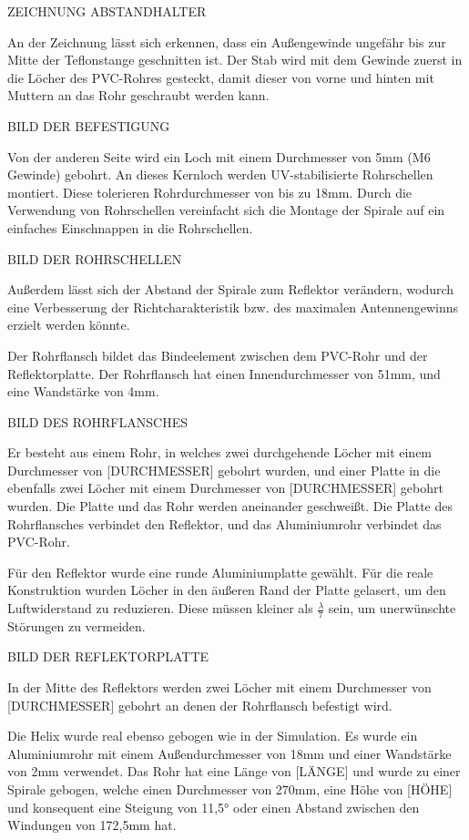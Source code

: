 ZEICHNUNG ABSTANDHALTER

An der Zeichnung lässt sich erkennen, dass ein Außengewinde ungefähr bis zur Mitte der Teflonstange geschnitten ist. Der Stab wird mit dem Gewinde zuerst in die Löcher des PVC-Rohres gesteckt, damit dieser von vorne und hinten mit Muttern an das Rohr geschraubt werden kann.

BILD DER BEFESTIGUNG

Von der anderen Seite wird ein Loch mit einem Durchmesser von 5mm (M6 Gewinde) gebohrt. An dieses Kernloch werden UV-stabilisierte Rohrschellen montiert. Diese tolerieren Rohrdurchmesser von bis zu 18mm. Durch die Verwendung von Rohrschellen vereinfacht sich die Montage der Spirale auf ein einfaches Einschnappen in die Rohrschellen.

BILD DER ROHRSCHELLEN

Außerdem lässt sich der Abstand der Spirale zum Reflektor verändern, wodurch eine Verbesserung der Richtcharakteristik bzw. des maximalen Antennengewinns erzielt werden könnte.

Der Rohrflansch bildet das Bindeelement zwischen dem PVC-Rohr und der Reflektorplatte. Der Rohrflansch hat einen Innendurchmesser von 51mm, und eine Wandstärke von 4mm.

BILD DES ROHRFLANSCHES

Er besteht aus einem Rohr, in welches zwei durchgehende Löcher mit einem Durchmesser von [DURCHMESSER] gebohrt wurden, und einer Platte in die ebenfalls zwei Löcher mit einem Durchmesser von [DURCHMESSER] gebohrt wurden. Die Platte und das Rohr werden aneinander geschweißt. Die Platte des Rohrflansches verbindet den Reflektor, und das Aluminiumrohr verbindet das PVC-Rohr.

Für den Reflektor wurde eine runde Aluminiumplatte gewählt. Für die reale Konstruktion wurden Löcher in den äußeren Rand der Platte gelasert, um den Luftwiderstand zu reduzieren. Diese müssen kleiner als $\frac{\lambda}{7}$ sein, um unerwünschte Störungen zu vermeiden.

BILD DER REFLEKTORPLATTE

In der Mitte des Reflektors werden zwei Löcher mit einem Durchmesser von [DURCHMESSER] gebohrt an denen der Rohrflansch befestigt wird. 

Die Helix wurde real ebenso gebogen wie in der Simulation. Es wurde ein Aluminiumrohr mit einem Außendurchmesser von 18mm und einer Wandstärke von 2mm verwendet. Das Rohr hat eine Länge von [LÄNGE] und wurde zu einer Spirale gebogen, welche einen Durchmesser von 270mm, eine Höhe von [HÖHE] und konsequent eine Steigung von 11,5° oder einen Abstand zwischen den Windungen von 172,5mm hat.

